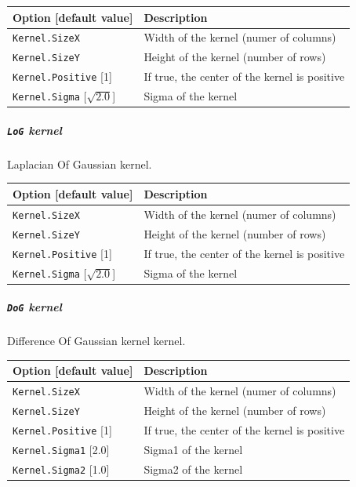 \documentclass[a4paper,11pt,oneside]{article}
\begin{document}
\begin{center}
 \begin{tabular}{| m{4cm} | m{7cm} | }
 \hline
 Option [default value] & Description\\
 \hline\hline
  \cellcolor{requiredcolor}\lstinline!Kernel.SizeX! & Width of the kernel
  (numer of columns)\\
  \cellcolor{requiredcolor}\lstinline!Kernel.SizeY! & Height of the kernel
  (number of rows)\\
  \lstinline!Kernel.Positive! [1] & If true, the center of the kernel is
  positive\\
  \lstinline!Kernel.Sigma! [$\sqrt{2.0}$] & Sigma of the kernel\\
 \hline
\end{tabular}
\end{center}


\subparagraph{\texorpdfstring{%
\lstinline[basicstyle=\ttfamily\bfseries]!LoG! kernel}{LoG kernel}}
Laplacian Of Gaussian kernel.

\begin{center}
 \begin{tabular}{| m{4cm} | m{7cm} | }
 \hline
 Option [default value] & Description\\
 \hline\hline
  \cellcolor{requiredcolor}\lstinline!Kernel.SizeX! & Width of the kernel
  (numer of columns)\\
  \cellcolor{requiredcolor}\lstinline!Kernel.SizeY! & Height of the kernel
  (number of rows)\\
  \lstinline!Kernel.Positive! [1] & If true, the center of the kernel is
  positive\\
  \lstinline!Kernel.Sigma! [$\sqrt{2.0}$] & Sigma of the kernel\\
 \hline
\end{tabular}
\end{center}

\subparagraph{\texorpdfstring{%
\lstinline[basicstyle=\ttfamily\bfseries]!DoG! kernel}{DoG kernel}}
Difference Of Gaussian kernel kernel.

\begin{center}
 \begin{tabular}{| m{4cm} | m{7cm} | }
 \hline
 Option [default value] & Description\\
 \hline\hline
  \cellcolor{requiredcolor}\lstinline!Kernel.SizeX! & Width of the kernel
  (numer of columns)\\
  \cellcolor{requiredcolor}\lstinline!Kernel.SizeY! & Height of the kernel
   (number of rows)\\
  \lstinline!Kernel.Positive! [1] & If true, the center of the kernel is
  positive\\
  \lstinline!Kernel.Sigma1! [2.0] & Sigma1 of the kernel\\
  \lstinline!Kernel.Sigma2! [1.0] & Sigma2 of the kernel\\
 \hline
\end{tabular}
\end{center}
\end{document}
